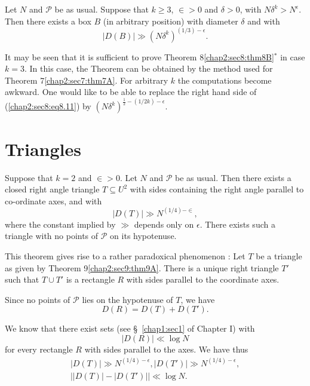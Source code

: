 \begin{theorem}[$^*$]\label{chap2:sec8:thm8B}
Let $N$ and $\mathscr{P}$ be as usual. Suppose that $k \geq 3$, $\in > 0$ and $\delta > 0$, with $N \delta^{k} > N^{\epsilon}$. Then there exists a box $B$ (in arbitrary position) with diameter $\delta$ and with 
\begin{equation*}
|D(B)| \gg (N \delta^{k})^{(1/3)-\epsilon}.\tag{8.11}\label{chap2:sec8:eq8.11} 
\end{equation*}\pageoriginale
\end{theorem}

\begin{remark*}
It may be seen that it is sufficient to prove Theorem 8\ref{chap2:sec8:thm8B}$^{*}$ in case $k=3$. In this case, the Theorem can be obtained by the method used for Theorem 7\ref{chap2:sec7:thm7A}. For arbitrary $k$ the computations become awkward. One would like to be able to replace the right hand side of (\ref{chap2:sec8:eq8.11}) by $(N \delta^{k})^{\frac{1}{2}-(1/2k)-\epsilon}$.
\end{remark*}

\section{Triangles}\label{chap2:sec9}

\begin{theorem}\label{chap2:sec9:thm9A}
Suppose that $k=2$ and $\in > 0$. Let $N$ and $\mathscr{P}$ be as usual. Then there exists a closed right angle triangle $T \subseteq U^{2}$ with sides containing the right angle parallel to co-ordinate axes, and with
$$
|D(T)| \gg N^{(1/4)-\in},
$$
where the constant implied by $\gg$ depends only on $\epsilon$. There exists such a triangle with no points of $\mathscr{P}$ on its hypotenuse.
\end{theorem}

This theorem gives rise to a rather paradoxical phenomenon : Let $T$ be a triangle as given by Theorem 9\ref{chap2:sec9:thm9A}. There is a unique right triangle $T'$ such that $T \cup T'$ is a rectangle $R$ with sides parallel to the coordinate axes.

Since no points of $\mathscr{P}$ lies on the hypotenuse of $T$, we have
$$
D(R) = D(T) + D(T').
$$

We know that there exist sets (see \S\ \ref{chap1:sec1} of Chapter I) with
$$
|D(R)| \ll \log N
$$
for every rectangle $R$ with sides parallel to the axes. We have thus
\begin{align*}
|D(T)| \gg N^{(1/4)-\epsilon}, |D(T')| \gg N^{(1/4)-\epsilon},\\
\left||D(T)| - |D(T')|\right| \ll \log N.
\end{align*}

